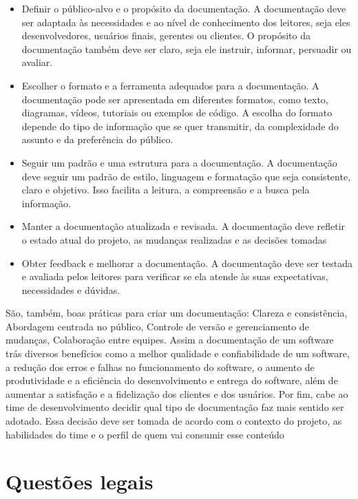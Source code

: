 \documentclass[12pt,oneside,a4paper,article]{abntex2}
\begin{document}
\begin{itemize}
  \item Definir o público-alvo e o propósito da documentação. A documentação deve ser adaptada às
        necessidades e ao nível de conhecimento dos leitores, seja eles desenvolvedores, usuários finais,
        gerentes ou clientes. O propósito da documentação também deve ser claro, seja ele instruir,
        informar, persuadir ou avaliar.
  \item Escolher o formato e a ferramenta adequados para a documentação. A documentação pode ser
        apresentada em diferentes formatos, como texto, diagramas, vídeos, tutoriais ou exemplos de
        código. A escolha do formato depende do tipo de informação que se quer transmitir, da
        complexidade do assunto e da preferência do público.
  \item Seguir um padrão e uma estrutura para a documentação. A documentação deve seguir um padrão
        de estilo, linguagem e formatação que seja consistente, claro e objetivo. Isso facilita a leitura, a
        compreensão e a busca pela informação.
  \item Manter a documentação atualizada e revisada. A documentação deve refletir o estado atual do
        projeto, as mudanças realizadas e as decisões tomadas
  \item Obter feedback e melhorar a documentação. A documentação deve ser testada e avaliada pelos
        leitores para verificar se ela atende às suas expectativas, necessidades e dúvidas.

\end{itemize}
São, também, boas práticas para criar um documentação: Clareza e consistência, Abordagem centrada no público, Controle de versão e gerenciamento de mudanças, Colaboração entre equipes.
Assim a documentação de um software trás diversos benefícios como a melhor qualidade e confiabilidade de um software, a redução dos erros e falhas no funcionamento do software, o aumento de produtividade e a eficiência do desenvolvimento e entrega do software, além de aumentar a satisfação e a fidelização dos clientes e dos usuários. Por fim, cabe ao time de desenvolvimento decidir qual tipo de documentação faz mais sentido ser adotado. Essa decisão deve ser tomada de acordo com o contexto do projeto, as habilidades do time e o perfil de quem vai
consumir esse conteúdo

\section{Questões legais}
\end{document}
